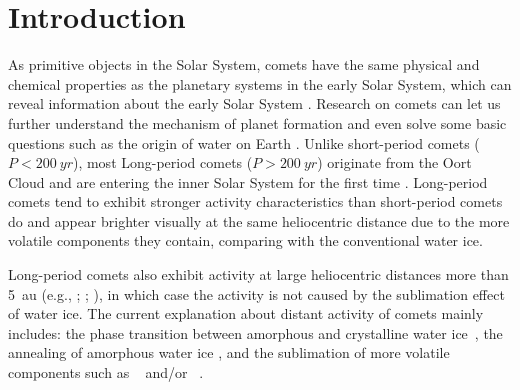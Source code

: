 \section{Introduction}

As primitive objects in the Solar System, comets have the same physical and chemical properties as the planetary systems in the early Solar System, which can reveal information about the early Solar System \citep{mazzotta_epifani_distant_2009, solontoi_ensemble_2012}. Research on comets can let us further understand the mechanism of planet formation and even solve some basic questions such as the origin of water on Earth \citep{alexander_water_2018}. Unlike short-period comets ($P<\qty{200}{yr}$), most Long-period comets ($P>\qty{200}{yr}$) originate from the Oort Cloud and are entering the inner Solar System for the first time \citep{jewittCOLORSYSTEMATICSCOMETS2015}. Long-period comets tend to exhibit stronger activity characteristics than short-period comets do and appear brighter visually at the same heliocentric distance due to the more volatile components they contain, comparing with the conventional water ice. 

Long-period comets also exhibit activity at large heliocentric distances more than {\qty{5}{\astronomicalunit}} (e.g., \citealt{mazzotta_epifani_distant_2009, mazzotta_epifani_activity_2010}; \citealt{meech_activity_2009}; \citealt{ivanova_quasi-simultaneous_2023}), in which case the activity is not caused by the sublimation effect of water ice. The current explanation about distant activity of comets mainly includes: the phase transition between amorphous and crystalline water ice~\citep{prialnik_crystallization_1992, capria_c1995_2002}, the annealing of amorphous water ice \citep{meech_activity_2009}, and the sublimation of more volatile components such as ~\citep{ootsubo_akari_2012} and/or ~\citep{jewitt_distant_2019}. 


